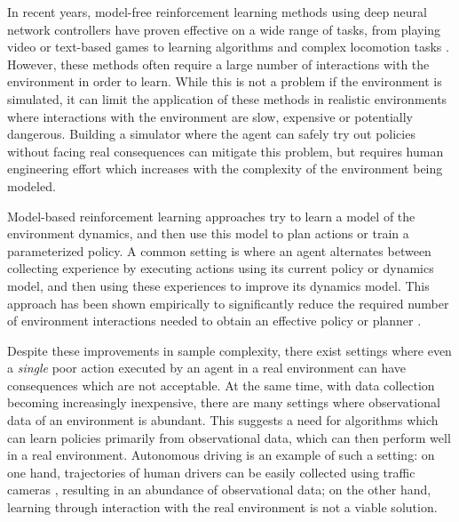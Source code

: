 \documentclass{article} %
\begin{document}
In recent years, model-free reinforcement learning methods using deep neural network controllers have proven effective on a wide range of tasks, from playing video or text-based games \citep{mnih15, A3C, NarasimhanKB15} to learning algorithms \citep{Zaremba15} and complex locomotion tasks \citep{Lillicrap2015, ZhangLMUC15}.
However, these methods often require a large number of interactions with the environment in order to learn.
While this is not a problem if the environment is simulated, it can limit the application of these methods in realistic environments where interactions with the environment are slow, expensive or potentially dangerous.
Building a simulator where the agent can safely try out policies without facing real consequences can mitigate this problem, but requires human engineering effort which increases with the complexity of the environment being modeled.


Model-based reinforcement learning approaches try to learn a model of the environment dynamics, and then use this model to plan actions or train a parameterized policy.
A common setting is where an agent alternates between collecting experience by executing actions using its current policy or dynamics model, and then using these experiences to improve its dynamics model.
This approach has been shown empirically to significantly reduce the required number of environment interactions needed to obtain an effective policy or planner \citep{Atkeson1997, PILCO, Nagabandi2017, Chua2018}.

Despite these improvements in sample complexity, there exist settings where even a \textit{single} poor action executed by an agent in a real environment can have consequences which are not acceptable.
At the same time, with data collection becoming increasingly inexpensive, there are many settings where observational data of an environment is abundant.
This suggests a need for algorithms which can learn policies primarily from observational data, which can then perform well in a real environment.
Autonomous driving is an example of such a setting: on one hand, trajectories of human drivers can be easily collected using traffic cameras \citep{NGSIM}, resulting in an abundance of observational data; on the other hand, learning through interaction with the real environment is not a viable solution.
\end{document}
